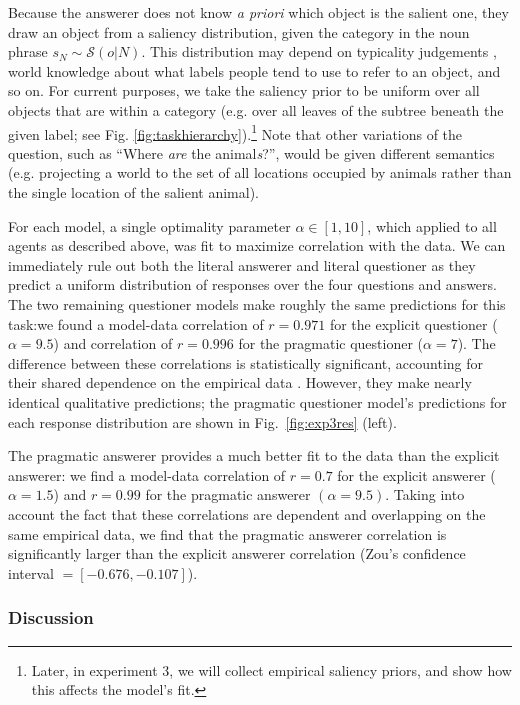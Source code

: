 \documentclass[12pt, floatsintext, jou]{apa6}
\begin{document}
Because the answerer does not know \emph{a priori} which object is the salient one, they draw an object from a saliency distribution, given the category in the noun phrase $s_N \sim \mathcal{S}(o | N)$. This distribution may depend on typicality judgements \cite{Rosch75}, world knowledge about what labels people tend to use to refer to an object, and so on. For current purposes, we take the saliency prior to be uniform over all objects that are within a category (e.g. over all leaves of the subtree beneath the given label; see Fig. \ref{fig:taskhierarchy}).\footnote{Later, in experiment 3, we will collect empirical saliency priors, and show how this affects the model's fit.} Note that other variations of the question, such as ``Where \emph{are} the animal\emph{s}?'', would be given different semantics (e.g. projecting a world to the set of all locations occupied by animals rather than the single location of the salient animal). 

For each model, a single optimality parameter $\alpha \in [1, 10]$, which applied to all agents as described above, was fit to maximize correlation with the data. We can immediately rule out both the literal answerer and literal questioner as they predict a uniform distribution of responses over the four questions and answers. 
The two remaining questioner models make roughly the same predictions for this task:we found a model-data correlation of $r = 0.971$ for the explicit questioner ($\alpha = 9.5$) and correlation of $r = 0.996$ for the pragmatic questioner ($\alpha = 7$). The difference between these correlations is statistically significant, accounting for their shared dependence on the empirical data \cite[Zou's 95\% confidence interval \textrm{= [-0.079, -0.009]}]{DiedenhofenMusch14_cocor}. However, they make nearly identical qualitative predictions; the pragmatic questioner model's predictions for each response distribution are shown in Fig.~\ref{fig:exp3res} (left). 

The pragmatic answerer provides a much better fit to the data than the explicit answerer: we find a model-data correlation of $r = 0.7$ for the explicit answerer ($\alpha = 1.5$) and $r = 0.99$ for the pragmatic answerer $(\alpha = 9.5)$.  Taking into account the fact that these correlations are dependent and overlapping on the same empirical data, we find that the pragmatic answerer correlation is significantly larger than the explicit answerer correlation (Zou's confidence interval $= [-0.676, -0.107]$). 

\subsubsection{Discussion}
\end{document}
